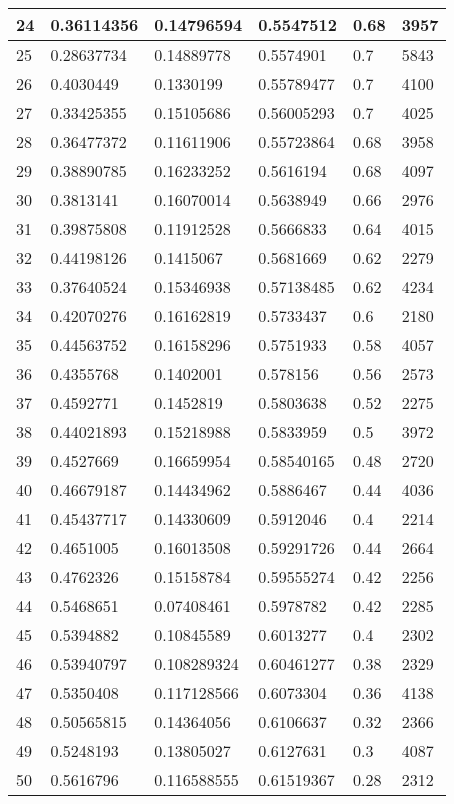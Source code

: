 \begin{longtable}{|l|l|l|l|l|l|}
24 & 0.36114356 & 0.14796594 & 0.5547512 & 0.68 & 3957 \\ \hline 
25 & 0.28637734 & 0.14889778 & 0.5574901 & 0.7 & 5843 \\ \hline 
26 & 0.4030449 & 0.1330199 & 0.55789477 & 0.7 & 4100 \\ \hline 
27 & 0.33425355 & 0.15105686 & 0.56005293 & 0.7 & 4025 \\ \hline 
28 & 0.36477372 & 0.11611906 & 0.55723864 & 0.68 & 3958 \\ \hline 
29 & 0.38890785 & 0.16233252 & 0.5616194 & 0.68 & 4097 \\ \hline 
30 & 0.3813141 & 0.16070014 & 0.5638949 & 0.66 & 2976 \\ \hline 
31 & 0.39875808 & 0.11912528 & 0.5666833 & 0.64 & 4015 \\ \hline 
32 & 0.44198126 & 0.1415067 & 0.5681669 & 0.62 & 2279 \\ \hline 
33 & 0.37640524 & 0.15346938 & 0.57138485 & 0.62 & 4234 \\ \hline 
34 & 0.42070276 & 0.16162819 & 0.5733437 & 0.6 & 2180 \\ \hline 
35 & 0.44563752 & 0.16158296 & 0.5751933 & 0.58 & 4057 \\ \hline 
36 & 0.4355768 & 0.1402001 & 0.578156 & 0.56 & 2573 \\ \hline 
37 & 0.4592771 & 0.1452819 & 0.5803638 & 0.52 & 2275 \\ \hline 
38 & 0.44021893 & 0.15218988 & 0.5833959 & 0.5 & 3972 \\ \hline 
39 & 0.4527669 & 0.16659954 & 0.58540165 & 0.48 & 2720 \\ \hline 
40 & 0.46679187 & 0.14434962 & 0.5886467 & 0.44 & 4036 \\ \hline 
41 & 0.45437717 & 0.14330609 & 0.5912046 & 0.4 & 2214 \\ \hline 
42 & 0.4651005 & 0.16013508 & 0.59291726 & 0.44 & 2664 \\ \hline 
43 & 0.4762326 & 0.15158784 & 0.59555274 & 0.42 & 2256 \\ \hline 
44 & 0.5468651 & 0.07408461 & 0.5978782 & 0.42 & 2285 \\ \hline 
45 & 0.5394882 & 0.10845589 & 0.6013277 & 0.4 & 2302 \\ \hline 
46 & 0.53940797 & 0.108289324 & 0.60461277 & 0.38 & 2329 \\ \hline 
47 & 0.5350408 & 0.117128566 & 0.6073304 & 0.36 & 4138 \\ \hline 
48 & 0.50565815 & 0.14364056 & 0.6106637 & 0.32 & 2366 \\ \hline 
49 & 0.5248193 & 0.13805027 & 0.6127631 & 0.3 & 4087 \\ \hline 
50 & 0.5616796 & 0.116588555 & 0.61519367 & 0.28 & 2312 \\ \hline 
\end{longtable}